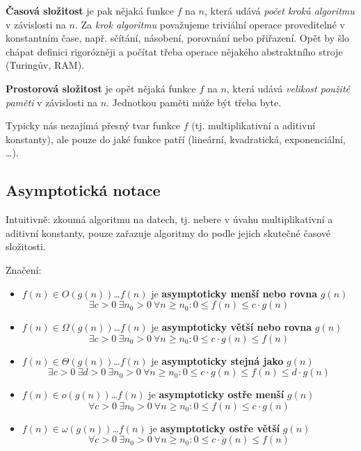 \documentclass[11pt]{report} %
\numberwithin{equation}{section}
\begin{document}
\textbf{Časová složitost} je pak nějaká funkce $f$ na $n$, která udává \textit{počet kroků algoritmu} v závislosti na $n$. Za \textit{krok algoritmu} považujeme triviální operace proveditelné v konstantním čase, např. sčítání, násobení, porovnání nebo přiřazení. Opět by šlo chápat definici rigorózněji a počítat třeba operace nějakého abstraktního stroje (Turingův, RAM).

\textbf{Prostorová složitost} je opět nějaká funkce $f$ na $n$, která udává \textit{velikost použité paměti} v závislosti na $n$. Jednotkou paměti může být třeba byte.

Typicky nás nezajímá přesný tvar funkce $f$ (tj. multiplikativní a aditivní konstanty), ale pouze do jaké 
 funkce patří (lineární, kvadratická, exponenciální, \dots). 

\subsection{Asymptotická notace}
Intuitivně: zkoumá  algoritmu na  datech, tj. nebere v úvahu multiplikativní a aditivní konstanty, pouze zařazuje algoritmy do  podle jejich skutečné časové složitosti.

Značení:
\begin{itemize}
	\item $f(n) \in O(g(n))$\quad \dots\quad $f(n)$ je \textbf{asymptoticky menší nebo rovna} $g(n)$
	$$\exists c > 0\ \exists n_0 > 0\ \forall n \geq n_0 : 0 \leq f(n) \leq c \cdot g(n)$$
	\item $f(n) \in \Omega(g(n))$\quad \dots\quad $f(n)$ je \textbf{asymptoticky větší nebo rovna} $g(n)$
	$$\exists c > 0\ \exists n_0 > 0\ \forall n \geq n_0 : 0 \leq c \cdot g(n) \leq f(n)$$
	\item $f(n) \in \Theta(g(n))$\quad \dots\quad $f(n)$ je \textbf{asymptoticky stejná jako} $g(n)$
	$$\exists c > 0\ \exists d > 0\ \exists n_0 > 0\ \forall n \geq n_0 : 0 \leq c\cdot g(n) \leq f(n) \leq d \cdot g(n)$$	
	\item $f(n) \in o(g(n))$\quad \dots\quad $f(n)$ je \textbf{asymptoticky ostře menší} $g(n)$
	$$\forall c > 0\ \exists n_0 > 0\ \forall n \geq n_0 : 0 \leq f(n) \leq c \cdot g(n)$$	
	\item $f(n) \in \omega(g(n))$\quad \dots\quad $f(n)$ je \textbf{asymptoticky ostře větší} $g(n)$
	$$\forall c > 0\ \exists n_0 > 0\ \forall n \geq n_0 : 0 \leq c \cdot g(n) \leq f(n)$$	
\end{itemize}
\end{document}

